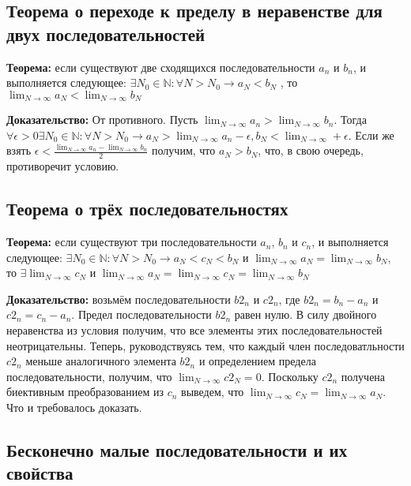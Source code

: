 \documentclass{article}
\begin{document}
\subsection{Теорема о переходе к пределу в неравенстве для двух последовательностей}

\textbf{Теорема:} если существуют две сходящихся последовательности $a_n$ и $b_n$, и выполняется следующее: $\exists N_0 \in \mathbb{N}: \forall N > N_0 \rightarrow a_N < b_N$ , то $\lim_{N \rightarrow \infty}a_N < \lim_{N\rightarrow\infty}b_N$

\textbf{Доказательство:} От противного. Пусть $\lim_{N \rightarrow \infty}a_n > \lim_{N \rightarrow \infty}b_n$. Тогда $\forall\epsilon>0 \exists N_0 \in \mathbb{N}: \forall N > N_0 \rightarrow a_N > \lim_{N \rightarrow \infty}a_n - \epsilon, b_N < \lim_{N \rightarrow \infty} + \epsilon$. Если же взять $\epsilon < \frac{\lim_{N \rightarrow \infty}a_n - \lim_{N \rightarrow \infty}b_n}{2}$ получим, что $a_N > b_N$, что, в свою очередь, противоречит условию.

\subsection{Теорема о трёх последовательностях}

\textbf{Теорема:} если существуют три последовательности $a_n$, $b_n$ и $c_n$, и выполняется следующее: $\exists N_0 \in \mathbb{N}: \forall N > N_0 \rightarrow a_N < c_N < b_N$ и $\lim_{N \rightarrow \infty}a_N = \lim_{N \rightarrow \infty}b_N$, то $\exists \lim_{N \rightarrow \infty}c_N$ и $\lim_{N \rightarrow \infty}a_N = \lim_{N \rightarrow \infty}c_N = \lim_{N\rightarrow\infty}b_N$

\textbf{Доказательство:} возьмём последовательности $b2_n$ и $c2_n$, где $b2_n = b_n - a_n$ и $c2_n = c_n - a_n$. Предел последовательности $b2_n$ равен нулю. В силу двойного неравенства из условия получим, что все элементы этих последовательностей неотрицательны. Теперь, руководствуясь тем, что каждый член последоватльности $c2_n$ меньше аналогичного элемента $b2_n$ и определением предела последовательности, получим, что $\lim_{N \rightarrow\infty}c2_N = 0$. Поскольку $c2_n$ получена биективным преобразованием из $c_n$ выведем, что $\lim_{N \rightarrow\infty}c_N = \lim_{N\rightarrow\infty}a_N$. Что и требовалось доказать.

\subsection{Бесконечно малые последовательности и их свойства}
\end{document}
